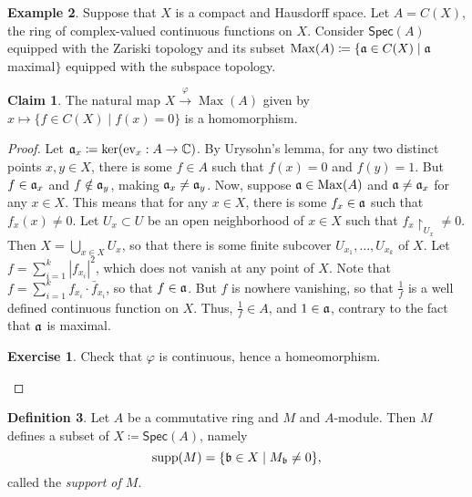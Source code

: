 \documentclass[10pt,letterpaper,cm]{nupset}
\theoremstyle{definition}
\newtheorem{definition}{Definition}[subsection]
\newtheorem{exmp}[definition]{Example}
\theoremstyle{theorem}
\newtheorem*{claim}{Claim}
\newtheorem{exercise}[definition]{Exercise}
\theoremstyle{remark}
\newcommand{\C}{\mathbb C}
\newcommand{\1}{\mathbf{1}}
\newcommand{\0}{\vec 0}
\DeclareMathOperator{\Max}{Max}
\DeclareMathOperator{\supp}{supp}
\begin{document}
\begin{exmp}
Suppose that $X$ is a compact and Hausdorff space. Let $A = C(X)$, the ring of complex-valued continuous functions on $X$. Consider $\mathsf{Spec}(A)$ equipped with the Zariski topology and its subset $\Max(A) \coloneqq  \{\frak{a} \in C(X) \mid \frak{a}$ maximal$\}$ equipped with the subspace topology.
\begin{claim}
The natural map $X \overset{\varphi}{\longrightarrow} {\Max(A)}$ given by $x \mapsto \{f\in C(X) \mid f(x) = 0\}$ is a homomorphism.
\end{claim}
\begin{proof}
Let $\frak{a}_x \coloneqq  \ker(\text{ev}_x : A \to \C)$.
By Urysohn's lemma, for any two distinct points $x,y \in X$, there is some $f\in A$ such that $f(x) = 0$ and $f(y) =1$. But $f \in \frak{a}_x$ and $f\notin \frak{a}_y$, making $\frak{a}_x \ne \frak{a}_y$.  Now, suppose $\frak{a} \in \Max(A)$ and $\frak{a} \ne \frak{a}_x$ for any $x\in X$. This means that for any $x\in X$, there is some $f_x \in \frak{a}$ such that $f_x(x) \ne 0$. Let $U_x \subset U$ be an open neighborhood of $x\in X$ such that $f_x \restriction_{U_x} \ne 0$.  Then $X = \bigcup_{x\in X} U_x$, so that there is some finite subcover $U_{x_1}, \ldots, U_{x_k}$ of $X$.  Let $f = \sum_{i=1}^k |f_{x_i}|^2$, which does not vanish at any point of $X$. Note that $f = \sum_{i=1}^k f_{x_i} \cdot \bar{f}_{x_i}$, so that $f\in \frak{a}$. But $f$ is nowhere vanishing, so that $\frac{1}{f}$ is a well defined continuous function on $X$. Thus, $\frac{1}{f} \in A$, and $1\in \frak{a}$, contrary to the fact that $\frak{a}$ is maximal. 
\begin{exercise}
Check that $\varphi$ is continuous, hence a homeomorphism. 
\end{exercise}
\end{proof}
\end{exmp}

\begin{definition}
Let $A$ be  a commutative ring and $M$ and $A$-module. Then $M$ defines a subset of $X\coloneqq  \mathsf{Spec}(A)$, namely $$\supp(M) = \{ \frak{b} \in X \mid M_{\frak{b}} \ne 0\},  $$ called the \textit{support of $M$}.
\end{definition}
\end{document}
